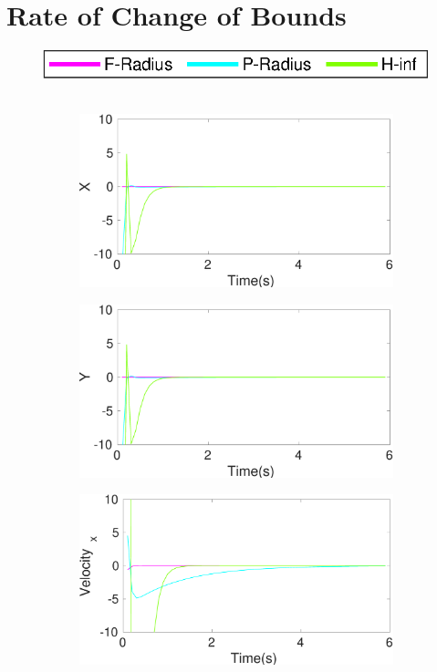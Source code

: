 \FloatBarrier
\section{Rate of Change of Bounds}\label{eresult:rate}
\begin{figure}[!h]
\hspace*{\fill} \includegraphics[scale=0.8]{figures/ratelegend}\\\\
\begin{subfigure}{.5\linewidth}
\centering
\includegraphics[width=\linewidth]{figures/BoundChange/CV/cv_bound_changeX}
\end{subfigure}
\begin{subfigure}{.5\linewidth}
\centering
\includegraphics[width=\linewidth]{figures/BoundChange/CV/cv_bound_changeY}
\end{subfigure}
\begin{subfigure}{.5\linewidth}
\centering
\includegraphics[width=\linewidth]{figures/BoundChange/CV/cv_bound_changeVelocity_x}

\end{subfigure}
\end{figure}
